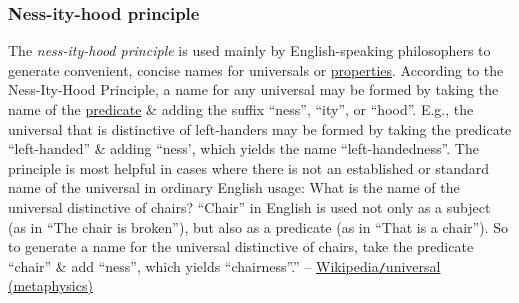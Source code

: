 \documentclass{article}
\begin{document}
\subsubsection{Ness-ity-hood principle}
The {\it ness-ity-hood principle} is used mainly by English-speaking philosophers to generate convenient, concise names for universals or \href{https://en.wikipedia.org/wiki/Property_(philosophy)}{properties}. According to the Ness-Ity-Hood Principle, a name for any universal may be formed by taking the name of the \href{https://en.wikipedia.org/wiki/Predicate_(grammar)}{predicate} \& adding the suffix ``ness'', ``ity'', or ``hood''. E.g., the universal that is distinctive of left-handers may be formed by taking the predicate ``left-handed'' \& adding ``ness', which yields the name ``left-handedness''. The principle is most helpful in cases where there is not an established or standard name of the universal in ordinary English usage: What is the name of the universal distinctive of chairs? ``Chair'' in English is used not only as a subject (as in ``The chair is broken''), but also as a predicate (as in ``That is a chair''). So to generate a name for the universal distinctive of chairs, take the predicate ``chair'' \& add ``ness'', which yields ``chairness''.'' -- \href{https://en.wikipedia.org/wiki/Universal_(metaphysics)}{Wikipedia{\tt/}universal (metaphysics)}

\end{document}
